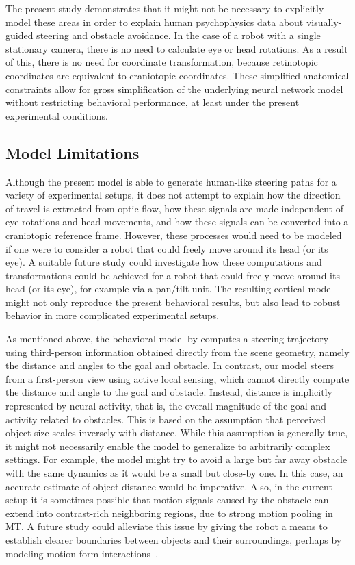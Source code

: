 The present study demonstrates that it might not be necessary
to explicitly model these areas in order to explain human psychophysics
data about visually-guided steering and obstacle avoidance.
In the case of a robot with a single stationary camera, there is
no need to calculate eye or head rotations. As a result of this, there
is no need for coordinate transformation, because retinotopic coordinates
are equivalent to craniotopic coordinates. These simplified
anatomical constraints allow for gross simplification of the underlying
neural network model without restricting behavioral performance,
at least under the present experimental conditions.


\subsection{Model Limitations}
\label{sec:ABR|discussion|limitations}
Although the present model is able to generate human-like
steering paths for a variety of experimental setups, it does not attempt
to explain how the direction of travel is extracted from optic
flow, how these signals are made independent of eye rotations and
head movements, and how these signals can be converted into a
craniotopic reference frame. However, these processes would need
to be modeled if one were to consider a robot that could freely
move around its head (or its eye). 
A suitable future study could investigate
how these computations and transformations could be
achieved for a robot that could freely move around its head (or its
eye), for example via a pan/tilt unit. The resulting cortical model
might not only reproduce the present behavioral results, but also
lead to robust behavior in more complicated experimental setups.

As mentioned above, the behavioral model by \cite{FajenWarren2003}
computes a steering trajectory using third-person
information obtained directly from the scene geometry, namely
the distance and angles to the goal and obstacle. In contrast, our
model steers from a first-person view using active local sensing,
which cannot directly compute the distance and angle to the goal
and obstacle. Instead, distance is implicitly represented by neural
activity, that is, the overall magnitude of the goal and activity
related to obstacles. This is based on the assumption that perceived
object size scales inversely with distance. While this assumption
is generally true, it might not necessarily enable the model to
generalize to arbitrarily complex settings. For example, the model
might try to avoid a large but far away obstacle with the same
dynamics as it would be a small but close-by one. In this case,
an accurate estimate of object distance would be imperative. Also,
in the current setup it is sometimes possible that motion signals
caused by the obstacle can extend into contrast-rich neighboring
regions, due to strong motion pooling in MT. A future study could
alleviate this issue by giving the robot a means to establish clearer
boundaries between objects and their surroundings, perhaps by
modeling motion-form interactions~\citep{Baloch1997}.

